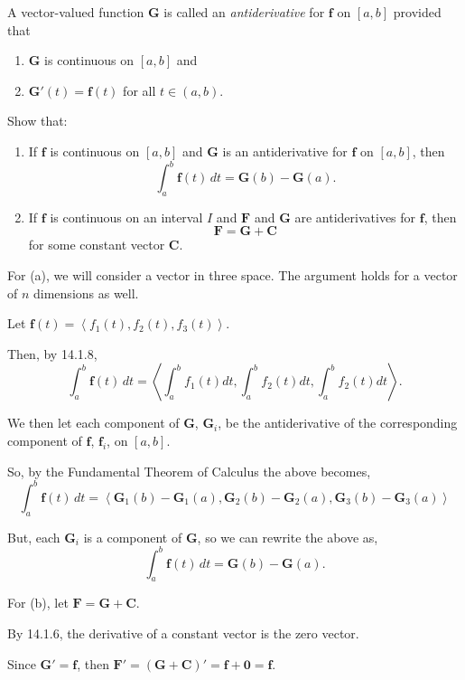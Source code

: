 \documentclass[../hw10]{subfiles}
\begin{document}
A vector-valued function $\mathbf{G}$ is called an \textit{antiderivative} for $\mathbf{f}$ on $[a,b]$ provided that
\begin{enumerate}[label= (\roman*)]
    \item $\mathbf{G}$ is continuous on $[a,b]$ and
    \item $\mathbf{G}'(t)=\mathbf{f}(t)$ for all $t\in(a,b)$.
\end{enumerate}
Show that:
\begin{enumerate}[label= (\alph*)]
    \item If $\mathbf{f}$ is continuous on $[a,b]$ and $\mathbf{G}$ is an antiderivative for $\mathbf{f}$ on $[a,b]$, then
    \[\int_{a}^{b}\mathbf{f}(t)\,dt=\mathbf{G}(b)-\mathbf{G}(a).\]
    \item If $\mathbf{f}$ is continuous on an interval $I$ and $\mathbf{F}$ and $\mathbf{G}$ are antiderivatives for $\mathbf{f}$, then
    \[\mathbf{F}=\mathbf{G}+\mathbf{C}\]
    for some constant vector $\mathbf{C}$.
\end{enumerate}

For (a), we will consider a vector in three space. The argument holds for a vector of $n$ dimensions as well.

Let $\mathbf{f}(t)=\left<f_1(t),f_2(t),f_3(t)\right>$.

Then, by 14.1.8, \[\int_{a}^{b}\mathbf{f}(t)\,dt=\left<\int_{a}^{b} f_1(t)dt,\int_{a}^{b} f_2(t)dt,\int_{a}^{b} f_2(t)dt\right>.\]

We then let each component of $\mathbf{G}$, $\mathbf{G}_i$, be the antiderivative of the corresponding component of $\mathbf{f}$, $\mathbf{f}_i$, on $[a,b]$.

So, by the Fundamental Theorem of Calculus the above becomes,
\[\int_{a}^{b}\mathbf{f}(t)\,dt=\left<\mathbf{G}_1(b)-\mathbf{G}_1(a),\mathbf{G}_2(b)-\mathbf{G}_2(a),\mathbf{G}_3(b)-\mathbf{G}_3(a)\right>\]

But, each $\mathbf{G}_i$ is a component of $\mathbf{G}$, so we can rewrite the above as,
\[\int_{a}^{b}\mathbf{f}(t)\,dt=\mathbf{G}(b)-\mathbf{G}(a).\]

For (b), let $\mathbf{F}=\mathbf{G}+\mathbf{C}$.

By 14.1.6, the derivative of a constant vector is the zero vector.

Since $\mathbf{G}'=\mathbf{f}$, then $\mathbf{F}'=(\mathbf{G}+\mathbf{C})'=\mathbf{f}+\mathbf{0}=\mathbf{f}$.
\end{document}
